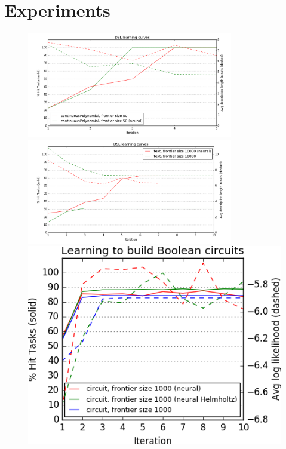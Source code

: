 \documentclass{article}
\begin{document}



\section{Experiments}

\begin{figure}
  \includegraphics[width = 9cm]{figures/polynomial.png}
  \includegraphics[width = 9cm]{figures/text.png}
  \includegraphics[width = \columnwidth]{figures/circuit.png} 
\end{figure}
\end{document}
